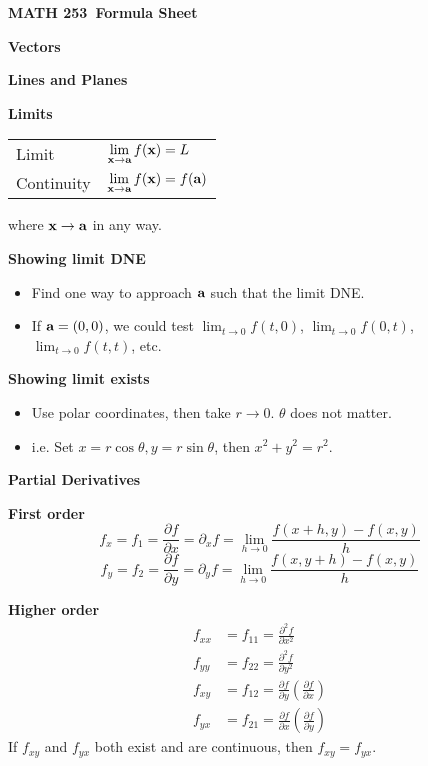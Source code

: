 \documentclass[10pt]{article}
\newcommand{\bvec}[1]{\bm{\textnormal{\bfseries #1}}}
\newcommand{\pd}[2]{\frac{\partial #1}{\partial #2}}
\newcommand{\pdd}[2]{\frac{\partial^2 #1}{\partial #2^2}}
\newcommand\sectionheading[1]{\begin{center}\large{\textbf{#1}}\end{center}\normalsize}
\newcommand\heading[1]{\smallskip\textbf{#1}\smallskip}
\newcommand*{\course}{MATH 253}
\begin{document}
\begin{center}
    \huge{\textbf{\course \ Formula Sheet}}
\end{center}

\begin{multicols*}{3}

\sectionheading{Vectors}

\sectionheading{Lines and Planes}

\sectionheading{Limits}
\begin{tabular}{@{}ll}
    Limit & $\displaystyle\lim_{\bvec x\to\bvec a}f(\bvec x)=L$ \\
    Continuity & $\displaystyle\lim_{\bvec x\to\bvec a}f(\bvec x)=f(\bvec a)$
\end{tabular}
where $\bvec x\to\bvec a$ in any way.

\heading{Showing limit DNE}

\begin{itemize}[itemsep=0pt,topsep=0pt]
    \item Find one way to approach $\bvec a$ such that the limit DNE.
    \item If $\bvec a=(0,0)$, we could test $\displaystyle\lim_{t\to 0}f(t,0)$, $\displaystyle\lim_{t\to 0}f(0,t)$, $\displaystyle\lim_{t\to 0}f(t,t)$, etc.
\end{itemize}

\heading{Showing limit exists}

\begin{itemize}[itemsep=0pt,topsep=0pt]
    \item Use polar coordinates, then take $r\to 0$. $\theta$ does not matter.
    \item i.e. Set $x=r\cos\theta,y=r\sin\theta$, then $x^2+y^2=r^2$.
\end{itemize}

\sectionheading{Partial Derivatives}

\heading{First order}
\[f_x=f_1=\pd fx=\partial_x f=\lim_{h\to 0}\frac{f(x+h,y)-f(x,y)}{h}\]
\[f_y=f_2=\pd fy=\partial_y f=\lim_{h\to 0}\frac{f(x,y+h)-f(x,y)}{h}\]

\heading{Higher order}
\begin{align*}
    f_{xx}&=f_{11}=\pdd fx \\
    f_{yy}&=f_{22}=\pdd fy \\
    f_{xy}&=f_{12}=\pd fy\left(\pd fx\right) \\
    f_{yx}&=f_{21}=\pd fx\left(\pd fy\right)
\end{align*}
{\small If $f_{xy}$ and $f_{yx}$ both exist and are continuous, then $f_{xy}=f_{yx}$.}


\end{multicols*}
\end{document}

